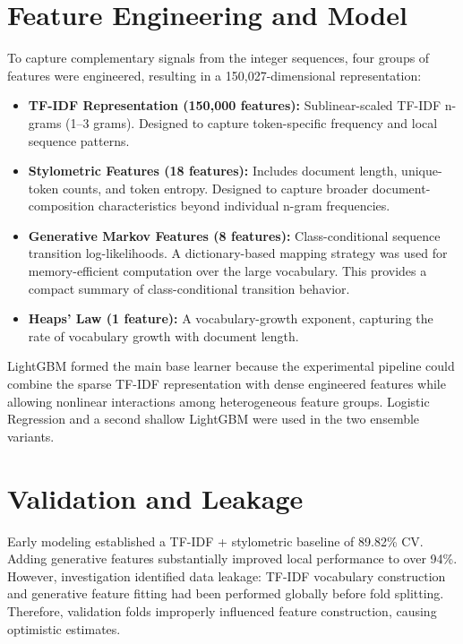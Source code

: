 \documentclass[11pt,a4paper]{article}
\begin{document}
\section{Feature Engineering and Model}
To capture complementary signals from the integer sequences, four groups of features were engineered, resulting in a 150,027-dimensional representation:

\begin{itemize}
    \setlength{\itemsep}{1pt}
    \setlength{\parskip}{0pt}
    \setlength{\parsep}{0pt}
    \item \textbf{TF-IDF Representation (150,000 features):} Sublinear-scaled TF-IDF n-grams (1--3 grams). Designed to capture token-specific frequency and local sequence patterns.
    \item \textbf{Stylometric Features (18 features):} Includes document length, unique-token counts, and token entropy. Designed to capture broader document-composition characteristics beyond individual n-gram frequencies.
    \item \textbf{Generative Markov Features (8 features):} Class-conditional sequence transition log-likelihoods. A dictionary-based mapping strategy was used for memory-efficient computation over the large vocabulary. This provides a compact summary of class-conditional transition behavior.
    \item \textbf{Heaps' Law (1 feature):} A vocabulary-growth exponent, capturing the rate of vocabulary growth with document length.
\end{itemize}

LightGBM formed the main base learner because the experimental pipeline could combine the sparse TF-IDF representation with dense engineered features while allowing nonlinear interactions among heterogeneous feature groups. Logistic Regression and a second shallow LightGBM were used in the two ensemble variants.

\section{Validation and Leakage}
Early modeling established a TF-IDF + stylometric baseline of 89.82\% CV. Adding generative features substantially improved local performance to over 94\%. However, investigation identified data leakage: TF-IDF vocabulary construction and generative feature fitting had been performed globally before fold splitting. Therefore, validation folds improperly influenced feature construction, causing optimistic estimates.
\end{document}
